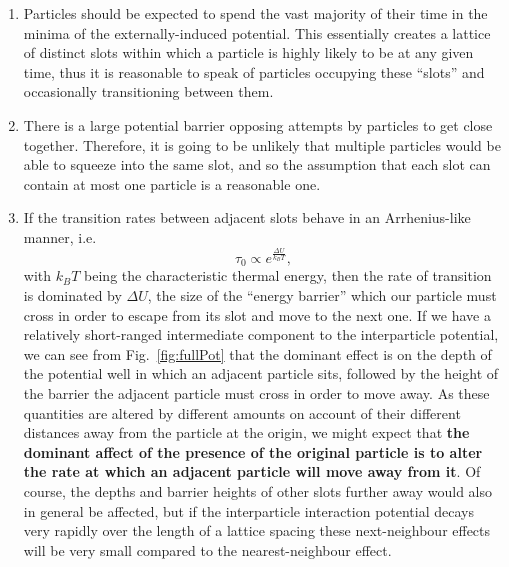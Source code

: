 \begin{enumerate}
\item Particles should be expected to spend the vast majority of their time in the minima of the 
externally-induced potential. This essentially creates a lattice of distinct slots within which a
particle
is highly likely to be at any given time, thus it is reasonable to speak of particles occupying these 
``slots'' and occasionally transitioning between them.
 \item There is a large potential barrier opposing attempts by particles to get close together. Therefore,
 it is going to be unlikely that multiple particles would be able to squeeze into the same slot,
 and so the assumption that each slot can contain at most one particle is a reasonable one.
 \item If the transition rates between adjacent slots behave in an Arrhenius-like manner, i.e.
 \begin{equation}
  \tau_0 \propto e^{\frac{\Delta U}{k_B T}},
 \end{equation}
 with $k_B T$ being the characteristic thermal energy,
then the rate of transition is dominated by $\Delta U$, the size of the ``energy barrier'' which
our particle must cross in order to escape from its slot and move to the next one. If we have a relatively
short-ranged intermediate component to the interparticle potential, we can see from Fig.~\ref{fig:fullPot}
that the dominant effect is on the depth of the potential well in which an adjacent particle sits, followed
by the height of the barrier the adjacent particle must cross in order to move away. As these
quantities are altered by different amounts on account of their different distances away from the particle
at the origin, we might expect that \textbf{the dominant affect of the presence of the original particle is
to alter the rate at which an adjacent particle will move away from it}. Of course, the depths and barrier
heights of other slots further away would also in general be affected, but if the interparticle interaction potential decays very rapidly over the length of a lattice spacing these next-neighbour effects will be
very small compared to the nearest-neighbour effect.
\end{enumerate}

